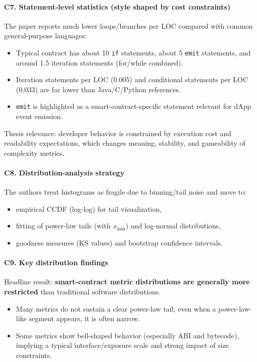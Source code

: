 \documentclass[11pt,a4paper]{article}
\begin{document}
\paragraph{C7. Statement-level statistics (style shaped by cost constraints)}
The paper reports much lower loops/branches per LOC compared with common general-purpose languages:
\begin{itemize}[leftmargin=*]
  \item Typical contract has about 10 \texttt{if} statements, about 5 \texttt{emit} statements, and around 1.5 iteration statements (for/while combined).
  \item Iteration statements per LOC (0.005) and conditional statements per LOC (0.033) are far lower than Java/C/Python references.
  \item \texttt{emit} is highlighted as a smart-contract-specific statement relevant for dApp event emission.
\end{itemize}
Thesis relevance: developer behavior is constrained by execution cost and readability expectations, which changes meaning, stability, and gameability of complexity metrics.

\paragraph{C8. Distribution-analysis strategy}
The authors treat histograms as fragile due to binning/tail noise and move to:
\begin{itemize}[leftmargin=*]
  \item empirical CCDF (log-log) for tail visualization,
  \item fitting of power-law tails (with $x_{\min}$) and log-normal distributions,
  \item goodness measures (KS values) and bootstrap confidence intervals.
\end{itemize}

\paragraph{C9. Key distribution findings}
Headline result: \textbf{smart-contract metric distributions are generally more restricted} than traditional software distributions.
\begin{itemize}[leftmargin=*]
  \item Many metrics do not sustain a clear power-law tail; even when a power-law-like segment appears, it is often narrow.
  \item Some metrics show bell-shaped behavior (especially ABI and bytecode), implying a typical interface/exposure scale and strong impact of size constraints.
\end{itemize}
\end{document}
